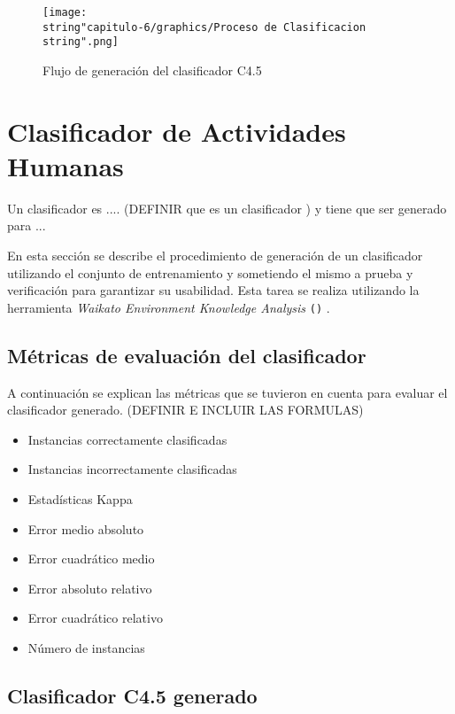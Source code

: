 \begin{figure}[th]
\begin{centering}
\texttt{[image: \\string"capitulo-6/graphics/Proceso de Clasificacion\\string".png]}
\par\end{centering}
\caption{\label{fig6:proceso-clasi}Flujo de generación del clasificador C4.5}
\end{figure}


\section{Clasificador de Actividades Humanas}

\label{sec6:clasificacion}Un clasificador es .... (DEFINIR que es
un clasificador ) y tiene que ser generado para ...

En esta sección se describe el procedimiento de generación de un clasificador
 utilizando el conjunto de entrenamiento y sometiendo el
mismo a prueba y verificación para garantizar su usabilidad. Esta
tarea se realiza utilizando la herramienta \emph{Waikato Environment
Knowledge Analysis} \texttt{()} \cite{Frank2016}. 

\subsection{Métricas de evaluación del clasificador}

A continuación se explican las métricas que se tuvieron en cuenta
para evaluar el clasificador generado. (DEFINIR E INCLUIR LAS FORMULAS)
\begin{itemize}
\item Instancias correctamente clasificadas
\item Instancias incorrectamente clasificadas
\item Estadísticas Kappa
\item Error medio absoluto
\item Error cuadrático medio
\item Error absoluto relativo
\item Error cuadrático relativo
\item Número de instancias
\end{itemize}

\subsection{Clasificador C4.5 generado}

